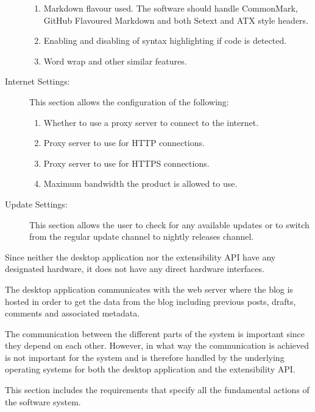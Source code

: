 \begin{description}
\begin{enumerate}
            \item {Markdown flavour used. The software should handle CommonMark, GitHub Flavoured Markdown and both
                   Setext and ATX style headers.}
            \item {Enabling and disabling of syntax highlighting if code is detected.}
            \item {Word wrap and other similar features.}
        \end{enumerate}
    \item [Internet Settings:] This section allows the configuration of the following:
        \begin{enumerate}
            \item {Whether to use a proxy server to connect to the internet.}
            \item {Proxy server to use for HTTP connections.}
            \item {Proxy server to use for HTTPS connections.}
            \item {Maximum bandwidth the product is allowed to use.}
        \end{enumerate}
    \item [Update Settings:] This section allows the user to check for any available updates or to switch from the
          regular update channel to nightly releases channel.
\end{description}


Since neither the desktop application nor the extensibility API have any designated hardware, it does not have any
direct hardware interfaces.


The desktop application communicates with the web server where the blog is hosted in order to get the data from the blog
including previous posts, drafts, comments and associated metadata.


The communication between the different parts of the system is important since they depend on each other. However, in
what way the communication is achieved is not important for the system and is therefore handled by the underlying
operating systems for both the desktop application and the extensibility API.


This section includes the requirements that specify all the fundamental actions of the software system.

